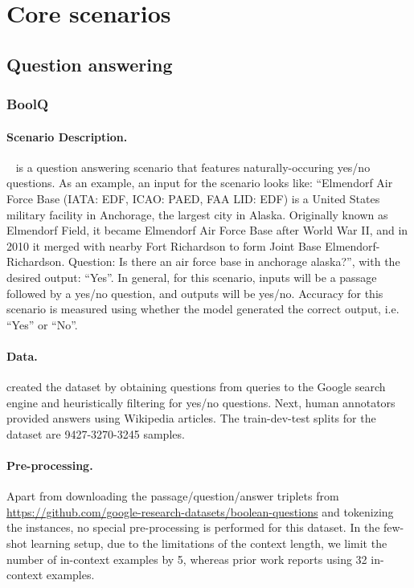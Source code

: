 \section{Core scenarios}
\label{app:generic-scenarios}
\subsection{Question answering}
\label{app:scenarios-QA}
\subsubsection{BoolQ}
\paragraph{Scenario Description.}
\boolq~\citep{clark2019boolq} is a question answering scenario that features naturally-occuring yes/no questions.
As an example, an input for the scenario looks like: ``Elmendorf Air Force Base (IATA: EDF, ICAO: PAED, FAA LID: EDF) is a United States military facility in Anchorage, the largest city in Alaska. Originally known as Elmendorf Field, it became Elmendorf Air Force Base after World War II, and in 2010 it merged with nearby Fort Richardson to form Joint Base Elmendorf-Richardson. Question: Is there an air force base in anchorage alaska?'', with the desired output: ``Yes''.
In general, for this scenario, inputs will be a passage followed by a yes/no question, and outputs will be yes/no.
Accuracy for this scenario is measured using whether the model generated the correct output, i.e. ``Yes'' or ``No''. 

\paragraph{Data.}
\citet{clark2019boolq} created the dataset by obtaining questions from queries to the Google search engine and heuristically filtering for yes/no questions. Next, human annotators provided answers using Wikipedia articles. The train-dev-test splits for the dataset are 9427-3270-3245 samples.

\paragraph{Pre-processing.}
Apart from downloading the passage/question/answer triplets from \url{https://github.com/google-research-datasets/boolean-questions} and tokenizing the instances, no special pre-processing is performed for this dataset. In the few-shot learning setup, due to the limitations of the context length, we limit the number of in-context examples by 5, whereas prior work \citep{brown2020gpt3} reports using 32 in-context examples.

